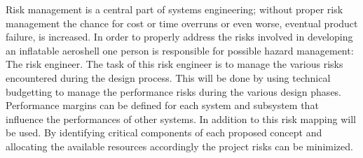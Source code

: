 Risk management is a central part of systems engineering; without proper risk management the chance for cost or time overruns or even worse, eventual product failure, is increased. In order to properly address the risks involved in developing an inflatable aeroshell one person is responsible for possible hazard management: The risk engineer. The task of this risk engineer is to manage the various risks encountered during the design process. This will be done by using technical budgetting to manage the performance risks during the various design phases. Performance margins can be defined for each system and subsystem that influence the performances of other systems. In addition to this risk mapping will be used. By identifying critical components of each proposed concept and allocating the available resources accordingly the project risks can be minimized.